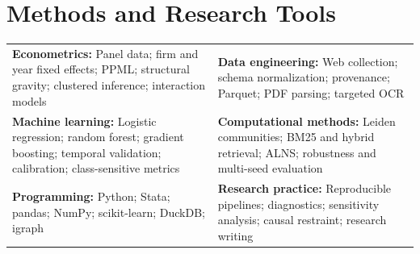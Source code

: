 \documentclass[10pt,a4paper]{article}
\begin{document}
\section{Methods and Research Tools}
\begin{tabularx}{\linewidth}{@{}X X@{}}
  \textbf{Econometrics:} Panel data; firm and year fixed effects; PPML; structural gravity; clustered inference; interaction models
  & \textbf{Data engineering:} Web collection; schema normalization; provenance; Parquet; PDF parsing; targeted OCR\\[2mm]
  \textbf{Machine learning:} Logistic regression; random forest; gradient boosting; temporal validation; calibration; class-sensitive metrics
  & \textbf{Computational methods:} Leiden communities; BM25 and hybrid retrieval; ALNS; robustness and multi-seed evaluation\\[2mm]
  \textbf{Programming:} Python; Stata; pandas; NumPy; scikit-learn; DuckDB; igraph
  & \textbf{Research practice:} Reproducible pipelines; diagnostics; sensitivity analysis; causal restraint; research writing
\end{tabularx}
\end{document}
